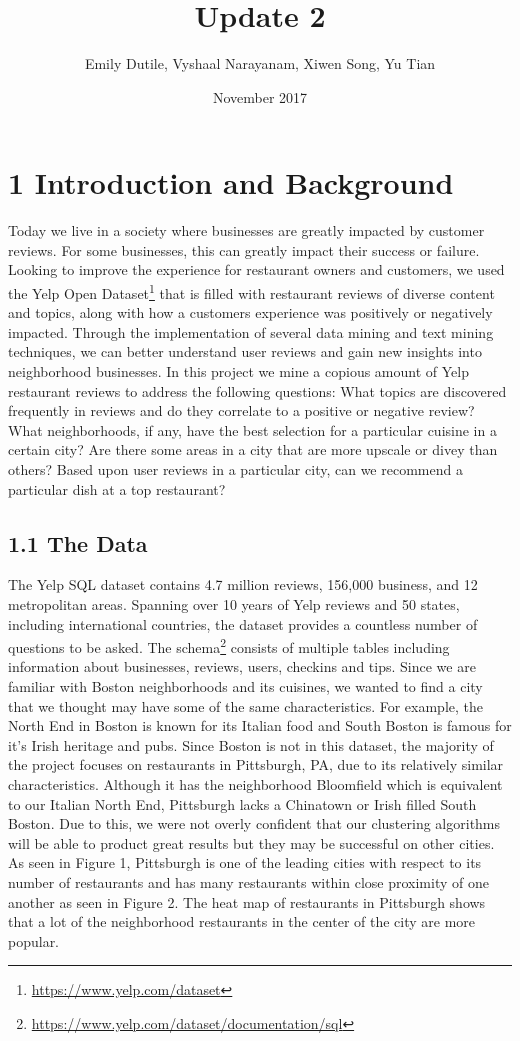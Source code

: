 \documentclass{neu_handout}
\title{Update 2}
\author{Emily Dutile, Vyshaal Narayanam, Xiwen Song, Yu Tian}
\date{November 2017}
\begin{document}
\section*{1 Introduction and Background}
Today we live in a society where businesses are greatly impacted by customer reviews. For some businesses, this can greatly impact their success or failure. Looking to improve the
experience for restaurant owners and customers, we used the Yelp Open Dataset\footnote{\url{https://www.yelp.com/dataset}} that is filled with restaurant reviews of diverse content and topics, along with how a customers experience was positively or negatively impacted. Through the implementation of several data mining and text mining techniques, we can better understand user reviews and gain new insights into neighborhood businesses. In this project we mine a copious amount of Yelp restaurant reviews to address the following questions: What topics are discovered frequently in reviews and do they correlate to a positive or negative review? What neighborhoods, if any, have the best selection for a particular cuisine in a certain city? Are there some areas in a city that are more upscale or divey than others? Based upon user reviews in a particular city, can we recommend a particular dish at a top restaurant?
\subsection*{1.1 The Data}
The Yelp SQL dataset contains 4.7 million reviews, 156,000 business, and 12 metropolitan areas. Spanning over 10 years of Yelp reviews and 50 states, including international countries, the dataset provides a countless number of questions to be asked. The schema\footnote{\url{https://www.yelp.com/dataset/documentation/sql}} consists of multiple tables including information about businesses, reviews, users, checkins and tips. Since we are familiar with Boston neighborhoods and its cuisines, we wanted to find a city that we thought may have some of the same characteristics. For example, the North End in Boston is known for its Italian food and South Boston is famous for it's Irish heritage and pubs. Since Boston is not in this dataset, the majority of the project focuses on restaurants in Pittsburgh, PA, due to its relatively similar characteristics. Although it has the neighborhood Bloomfield which is equivalent to our Italian North End, Pittsburgh lacks a Chinatown or Irish filled South Boston. Due to this, we were not overly confident that our clustering algorithms will be able to product great results but they may be successful on other cities.
As seen in Figure 1, Pittsburgh is one of the leading cities with respect to its number of restaurants and has many restaurants within close proximity of one another as seen in Figure 2. The heat map of restaurants in Pittsburgh shows that a lot of the neighborhood restaurants in the center of the city are more popular.
\end{document}
